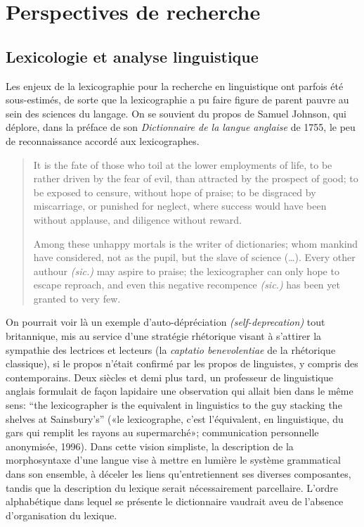 \section{Perspectives de recherche}
\label{sec:recherche}

\subsection{Lexicologie et analyse linguistique}

Les enjeux de la lexicographie pour la recherche en linguistique ont parfois été sous-estimés, de sorte que la lexicographie a pu faire figure de parent pauvre au sein des sciences du langage. On se souvient du propos de Samuel Johnson, qui déplore, dans la préface de son \emph{Dictionnaire de la langue anglaise} de 1755, le peu de reconnaissance accordé aux lexicographes.

\begin{quotation}
    It is the fate of those who toil at the lower employments of life, to be rather driven by the fear of evil, than attracted by the prospect of good; to be exposed to censure, without hope of praise; to be disgraced by miscarriage, or punished for neglect, where success would have been without applause, and diligence without reward.

    Among these unhappy mortals is the writer of dictionaries; whom mankind have considered, not as the pupil, but the slave of science (…). Every other authour \emph{(sic.)} may aspire to praise; the lexicographer can only hope to escape reproach, and even this negative recompence \emph{(sic.)} has been yet granted to very few.
\end{quotation}

On pourrait voir là un exemple d'auto-dépréciation \emph{(self-deprecation)} tout britannique, mis au service d'une stratégie rhétorique visant à s'attirer la sympathie des lectrices et lecteurs (la \emph{captatio benevolentiae} de la rhétorique classique), si le propos n'était confirmé par les propos de linguistes, y compris des contemporains. Deux siècles et demi plus tard, un professeur de linguistique anglais formulait de façon lapidaire une observation qui allait bien dans le même sens: “the lexicographer is the equivalent in linguistics to the guy stacking the shelves at Sainsbury’s” («le lexicographe, c'est l'équivalent, en linguistique, du gars qui remplit les rayons au supermarché»; communication personnelle anonymisée, 1996). %
Dans cette vision simpliste, la description de la morphosyntaxe d’une langue vise à mettre en lumière le système grammatical dans son ensemble, à déceler les liens qu’entretiennent ses diverses composantes, tandis que la description du lexique serait nécessairement parcellaire. L’ordre alphabétique dans lequel se présente le dictionnaire vaudrait aveu de l’absence d’organisation du lexique.

